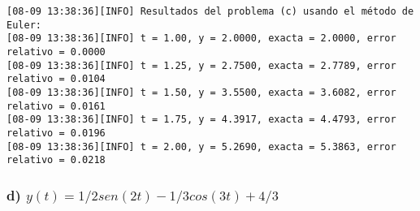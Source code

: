 \documentclass[
  letterpaper,
  DIV=11,
  numbers=noendperiod]{scrartcl}
\begin{document}
\begin{verbatim}
[08-09 13:38:36][INFO] Resultados del problema (c) usando el método de Euler:
[08-09 13:38:36][INFO] t = 1.00, y = 2.0000, exacta = 2.0000, error relativo = 0.0000
[08-09 13:38:36][INFO] t = 1.25, y = 2.7500, exacta = 2.7789, error relativo = 0.0104
[08-09 13:38:36][INFO] t = 1.50, y = 3.5500, exacta = 3.6082, error relativo = 0.0161
[08-09 13:38:36][INFO] t = 1.75, y = 4.3917, exacta = 4.4793, error relativo = 0.0196
[08-09 13:38:36][INFO] t = 2.00, y = 5.2690, exacta = 5.3863, error relativo = 0.0218
\end{verbatim}

\subsubsection{\texorpdfstring{d)
\(y(t)=1/2sen(2t)-1/3cos(3t)+4/3\)}{d) y(t)=1/2sen(2t)-1/3cos(3t)+4/3}}\label{d-yt12sen2t-13cos3t43}
\end{document}
